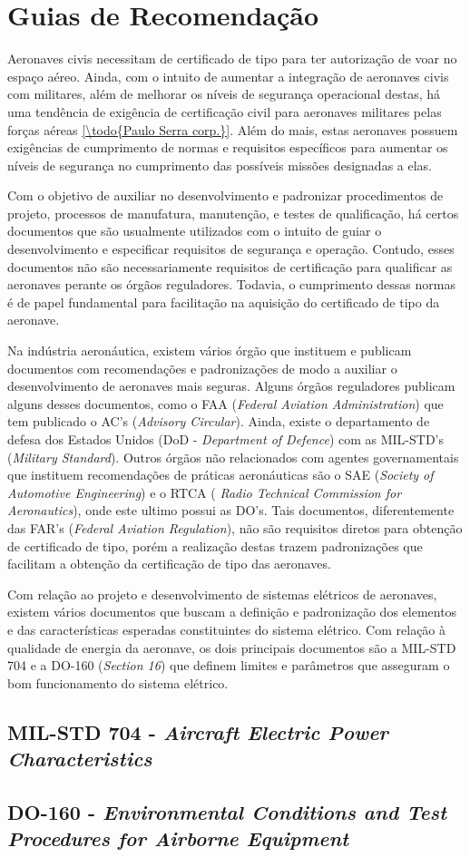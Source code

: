 \section{Guias de Recomendação}

Aeronaves civis necessitam de certificado de tipo para ter autorização de voar no espaço aéreo. Ainda, com o intuito de aumentar a integração de aeronaves civis com militares, além de melhorar os níveis de segurança operacional destas, há uma tendência de exigência de certificação civil para aeronaves militares pelas forças aéreas \ref{\todo{Paulo Serra corp.}}. Além do mais, estas aeronaves possuem exigências de cumprimento de normas e requisitos específicos para aumentar os níveis de segurança no cumprimento das possíveis missões designadas a elas.

Com o objetivo de auxiliar no desenvolvimento e padronizar procedimentos de projeto, processos de manufatura, manutenção, e testes de qualificação, há certos documentos que são usualmente utilizados com o intuito de guiar o desenvolvimento e especificar requisitos de segurança e operação. Contudo, esses documentos não são necessariamente requisitos de certificação para qualificar as aeronaves perante os órgãos reguladores. Todavia, o cumprimento dessas normas é de papel fundamental para facilitação na aquisição do certificado de tipo da aeronave.

Na indústria aeronáutica, existem vários órgão que instituem e publicam documentos com recomendações e padronizações de modo a auxiliar o desenvolvimento de aeronaves mais seguras. Alguns órgãos reguladores publicam alguns desses documentos, como o FAA (\textit{Federal Aviation Administration}) que tem publicado o AC’s (\textit{Advisory Circular}). Ainda, existe o departamento de defesa dos Estados Unidos (DoD - \textit{Department of Defence}) com as MIL-STD’s (\textit{Military Standard}). Outros órgãos não relacionados com agentes governamentais que instituem recomendações de práticas aeronáuticas são o SAE (\textit{Society of Automotive Engineering}) e o RTCA (\textit{ Radio Technical Commission for Aeronautics}), onde este ultimo possui as DO’s. Tais documentos, diferentemente das FAR’s (\textit{Federal Aviation Regulation}), não são requisitos diretos para obtenção de certificado de tipo, porém a realização destas trazem padronizações que facilitam a obtenção da certificação de tipo das aeronaves.

Com relação ao projeto e desenvolvimento de sistemas elétricos de aeronaves, existem vários documentos que buscam a definição e padronização dos elementos e das características esperadas constituintes do sistema elétrico. Com relação à qualidade de energia da aeronave, os dois principais documentos são a MIL-STD 704 e a DO-160 (\textit{Section 16}) que definem limites e parâmetros que asseguram o bom funcionamento do sistema elétrico.

\subsection{MIL-STD 704 - \textit{Aircraft Electric Power Characteristics}}

\subsection{DO-160 - \textit{Environmental Conditions and Test Procedures for Airborne Equipment}}
